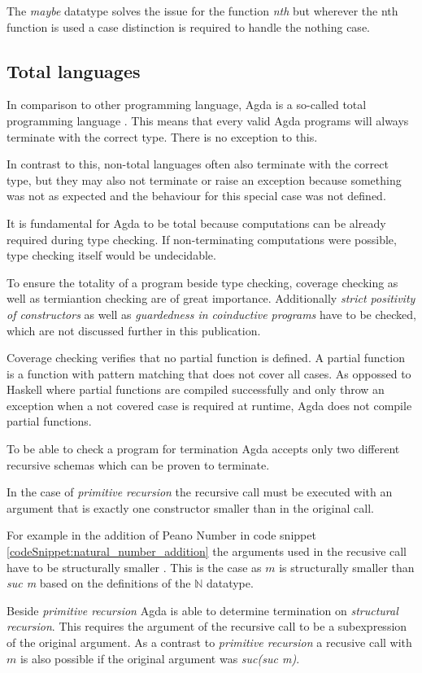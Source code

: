 The \emph{maybe} datatype solves the issue for the function \emph{nth} but wherever the nth function is used a case distinction is required to handle the nothing case.

\subsection{Total languages}\label{section:total_languages}
In comparison to other programming language, Agda is a so-called total programming language \cite{AgdaReadTheDocs}.
This means that every valid Agda programs will always terminate with the correct type. There is no exception to this.

In contrast to this, non-total languages often also terminate with the correct type, but they may also not terminate or raise an exception because something was not as expected and the behaviour for this special case was not defined.

It is fundamental for Agda to be total because computations can be already required during type checking.
If non-terminating computations were possible, type checking itself would be undecidable\cite{agda_wiki_totality}.

To ensure the totality of a program beside type checking, coverage checking as well as termiantion checking are of great importance. 
Additionally \emph{strict positivity of constructors} as well as \emph{guardedness in coinductive programs} have to be checked, which are not discussed further in this publication.

Coverage checking verifies that no partial function is defined. A partial function is a function with pattern matching that does not cover all cases.
As oppossed to Haskell where partial functions are compiled successfully and only throw an exception when a not covered case is required at runtime, Agda does not compile partial functions.

To be able to check a program for termination Agda accepts only two different recursive schemas which can be proven to terminate.

In the case of \emph{primitive recursion} the recursive call must be executed with an argument that is exactly one constructor smaller than in the original call.

For example in the addition of Peano Number in code snippet \ref{codeSnippet:natural_number_addition} the arguments used in the recusive call have to be structurally smaller \cite{norell:deptyped}. 
This is the case as $m$ is structurally smaller than \emph{suc m} based on the definitions of the $\mathbb{N}$ datatype.

Beside \emph{primitive recursion} Agda is able to determine termination on \emph{structural recursion}.
This requires the argument of the recursive call to be a subexpression of the original argument.
As a contrast to \emph{primitive recursion} a recusive call with $m$ is also possible if the original argument was \emph{suc(suc m)}.